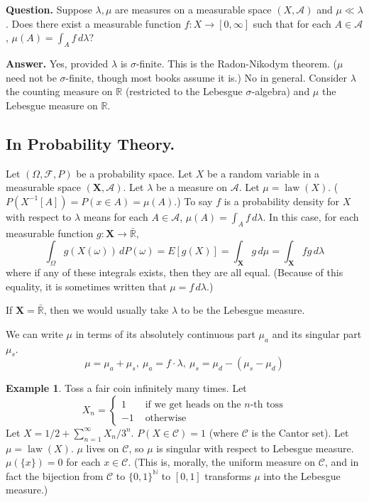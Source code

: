 \documentclass{article}
\DeclareMathOperator{\law}{law}
\newcommand{\R}{\mathbb{R}}
\newcommand{\N}{\mathbb{N}}
\newcommand{\F}{\mathscr{F}}
\newcommand{\coin}{\{0,1\}^{\N}}
\theoremstyle{definition}
\newtheorem*{example}{Example}
\begin{document}
\textbf{Question.} Suppose $\lambda, \mu$ are measures on a measurable space $(X, \mathscr{A})$ and $\mu \ll \lambda$. Does there exist a measurable function $f : X \longrightarrow [0, \infty]$ such that for each $A \in \mathscr{A}$, $\mu(A) = \int_A f\,d\lambda$?

\textbf{Answer.} Yes, provided $\lambda$ is $\sigma$-finite. This is the Radon-Nikodym theorem. ($\mu$ need not be $\sigma$-finite, though most books assume it is.) No in general. Consider $\lambda$ the counting measure on $\R$ (restricted to the Lebesgue $\sigma$-algebra) and $\mu$ the Lebesgue measure on $\R$.

\subsection*{In Probability Theory.}
Let $(\Omega, \F, P)$ be a probability space. Let $X$ be a random variable in a measurable space $(\mathbf{X}, \mathscr{A})$. Let $\lambda$ be a measure on $\mathscr{A}$. Let $\mu = \law(X)$. ($P(X^{-1}[A]) = P(x \in A) = \mu(A)$.)
To say $f$ is a probability density for $X$ with respect to $\lambda$ means for each $A \in \mathscr{A}$, $\mu(A) = \int_A f\,d\lambda$. In this case, for each measurable function $g : \mathbf{X} \longrightarrow \bar{\R}$,
\[
    \int_\Omega g(X(\omega))\,dP(\omega) = E[g(X)] = \int_\mathbf{X} g\,d\mu = \int_\mathbf{X} fg\,d\lambda
\]
where if any of these integrals exists, then they are all equal. (Because of this equality, it is sometimes written that $\mu = f\,d\lambda$.)

If $\mathbf{X} = \bar{\R}$, then we would usually take $\lambda$ to be the Lebesgue measure.

We can write $\mu$ in terms of its absolutely continuous part $\mu_a$ and its singular part $\mu_s$.
\[
    \mu = \mu_a + \mu_s, \ \mu_a = f \cdot \lambda, \ \mu_s = \mu_d - (\mu_s - \mu_d)
\]

\begin{example}
Toss a fair coin infinitely many times. Let
\[
    X_n = \begin{cases}
        1 & \text{ if we get heads on the } n\text{-th toss} \\
        -1 & \text{ otherwise}
    \end{cases}
\]
Let $X = 1/2 + \sum_{n=1}^\infty X_n/3^n$. $P(X \in \mathcal{C}) = 1$ (where $\mathcal{C}$ is the Cantor set). Let $\mu = \law(X)$. $\mu$ lives on $\mathcal{C}$, so $\mu$ is singular with respect to Lebesgue measure. $\mu(\{x\}) = 0$ for each $x \in \mathcal{C}$. (This is, morally, the uniform measure on $\mathcal{C}$, and in fact the bijection from $\mathcal{C}$ to $\coin$ to $[0,1]$ transforms $\mu$ into the Lebesgue measure.)
\end{example}
\end{document}
